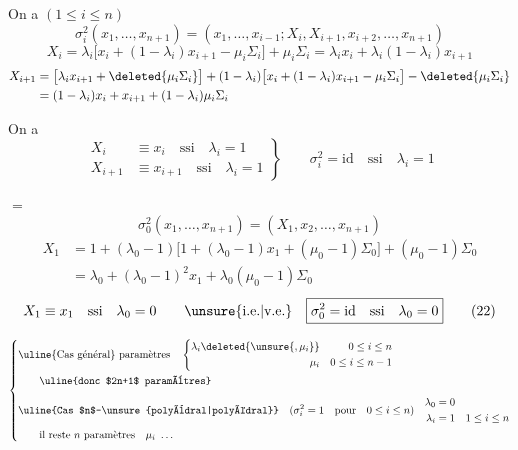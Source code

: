 On a $(1\leq i\leq n)$
\[
\sigma_i^2(x_1,\ldots,x_{n+1})=(x_1,\ldots,x_{i-1};X_i,X_{i+1},x_{i+2},\ldots,x_{n+1})
\]
\[
X_i=\lambda_i\bigl[x_i+(1-\lambda_i)x_{i+1}-\mu_i\Sigma_i\bigr]+\mu_i\Sigma_i
=\lambda_i x_i+\lambda_i(1-\lambda_i)x_{i+1}
\]
\[
\begin{aligned}
X_{i+1}&=\bigl[\lambda_i x_{i+1}+\deleted{\mu_i\Sigma_i}\bigr]+(1-\lambda_i)\bigl[x_i+(1-\lambda_i)x_{i+1}-\mu_i\Sigma_i\bigr]-\deleted{\mu_i\Sigma_i}\\
&=(1-\lambda_i)x_i+x_{i+1}+(1-\lambda_i)\mu_i\Sigma_i
\end{aligned}
\]

On a
\[
\left.\begin{aligned}
X_i&\equiv x_i\quad\text{ssi}\quad\lambda_i=1\\
X_{i+1}&\equiv x_{i+1}\quad\text{ssi}\quad\lambda_i=1
\end{aligned}\right\}
\qquad\boxed{\sigma_i^2=\mathrm{id}\quad\text{ssi}\quad\lambda_i=1}
\tag*{(21)}
\]

 $=$
\[
\sigma_0^2(x_1,\ldots,x_{n+1})=(X_1,x_2,\ldots,x_{n+1})
\]
\[
\begin{aligned}
X_1&=1+(\lambda_0-1)\bigl[1+(\lambda_0-1)x_1+(\mu_0-1)\Sigma_0\bigr]+(\mu_0-1)\Sigma_0\\
&=\lambda_0+(\lambda_0-1)^2x_1+\lambda_0(\mu_0-1)\Sigma_0
\end{aligned}
\]
\[
X_1\equiv x_1\quad\text{ssi}\quad\lambda_0=0\qquad\text{\unsure{i.e.|v.e.}}\quad
\boxed{\sigma_0^2=\mathrm{id}\quad\text{ssi}\quad\lambda_0=0}
\tag*{(22)}
\]

\[
\left\{\begin{aligned}
&\text{\uline{Cas général} paramètres}\quad
\left\{\begin{aligned}\lambda_i\deleted{\unsure{,\mu_i}}&&0\leq i\leq n\\\mu_i&&0\leq i\leq n-1\end{aligned}\right.\\
&\qquad\text{\uline{donc $2n+1$ paramètres}}\\[1ex]
&\text{\uline{Cas $n$-\unsure{polyèdral|polyédral}}}\quad(\sigma_i^2=1\quad\text{pour}\quad0\leq i\leq n)\quad
\begin{aligned}\lambda_0&=0\\\lambda_i&=1\quad1\leq i\leq n\end{aligned}\\
&\qquad\text{il reste $n$ paramètres}\quad\mu_i\ \ldots
\end{aligned}\right.
\]
